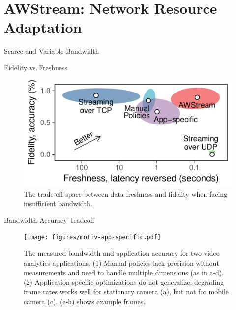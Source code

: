\section{AWStream: Network Resource Adaptation}

\begin{frame}{Scarce and Variable Bandwidth}

\end{frame}

\begin{frame}{Fidelity vs.\,Freshness}
  \vspace{2em}
  \begin{figure}
    \centering
    \includegraphics[width=0.8\columnwidth]{figures/fidelity-freshness.pdf}
    \caption{The trade-off space between data freshness and fidelity when facing
      insufficient bandwidth.}
  \end{figure}
\end{frame}



\begin{frame}{Bandwidth-Accuracy Tradeoff}
  \begin{figure}
    \centering
    \texttt{[image: figures/motiv-app-specific.pdf]}
    \caption{The measured bandwidth and application accuracy for two video
      analytics applications. (1) Manual policies lack precision without
      measurements and need to handle multiple dimensions (as in a-d). (2)
      Application-specific optimizations do not generalize: degrading frame rates
      works well for stationary camera (a), but not for mobile camera (c). (e-h)
      shows example frames.}
    \label{fig:app-specific}
  \end{figure}
\end{frame}

